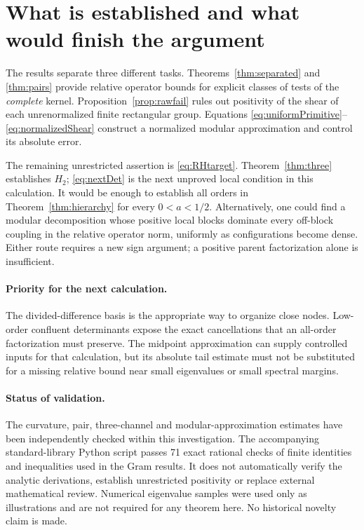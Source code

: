 \documentclass[11pt,letterpaper]{article}
\numberwithin{equation}{section}
\theoremstyle{remark}\newtheorem{remark}[theorem]{Remark}
\begin{document}


\section{What is established and what would finish the argument}
The results separate three different tasks. Theorems~\ref{thm:separated} and \ref{thm:pairs} provide relative operator bounds for explicit classes of tests of the \emph{complete} kernel. Proposition~\ref{prop:rawfail} rules out positivity of the shear of each unrenormalized finite rectangular group. Equations \eqref{eq:uniformPrimitive}--\eqref{eq:normalizedShear} construct a normalized modular approximation and control its absolute error.

The remaining unrestricted assertion is \eqref{eq:RHtarget}. Theorem~\ref{thm:three} establishes $H_2$; \eqref{eq:nextDet} is the next unproved local condition in this calculation. It would be enough to establish all orders in Theorem~\ref{thm:hierarchy} for every $0<a<1/2$. Alternatively, one could find a modular decomposition whose positive local blocks dominate every off-block coupling in the relative operator norm, uniformly as configurations become dense. Either route requires a new sign argument; a positive parent factorization alone is insufficient.

\paragraph{Priority for the next calculation.}
The divided-difference basis is the appropriate way to organize close nodes. Low-order confluent determinants expose the exact cancellations that an all-order factorization must preserve. The midpoint approximation can supply controlled inputs for that calculation, but its absolute tail estimate must not be substituted for a missing relative bound near small eigenvalues or small spectral margins.

\paragraph{Status of validation.}
The curvature, pair, three-channel and modular-approximation estimates have been independently checked within this investigation. The accompanying standard-library Python script passes 71 exact rational checks of finite identities and inequalities used in the Gram results. It does not automatically verify the analytic derivations, establish unrestricted positivity or replace external mathematical review. Numerical eigenvalue samples were used only as illustrations and are not required for any theorem here. No historical novelty claim is made.
\end{document}
